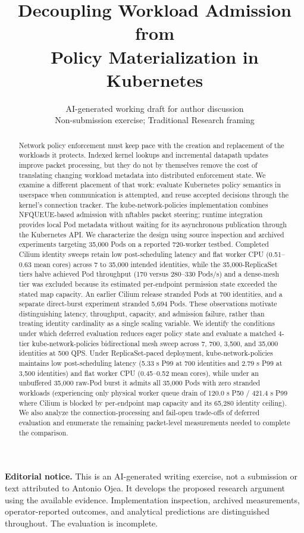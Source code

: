 \documentclass[letterpaper,twocolumn,10pt]{article}
\title{\Large\bf Decoupling Workload Admission from\\
Policy Materialization in Kubernetes}
\author{AI-generated working draft for author discussion\\
Non-submission exercise; Traditional Research framing}
\date{}
\begin{document}
\maketitle
\noindent\textbf{Editorial notice.} This is an AI-generated writing exercise,
not a submission or text attributed to Antonio Ojea. It develops the proposed
research argument using the available evidence. Implementation inspection,
archived measurements, operator-reported outcomes, and analytical predictions
are distinguished throughout. The evaluation is incomplete.

\begin{abstract}
Network policy enforcement must keep pace with the creation and replacement
of the workloads it protects. Indexed kernel lookups and incremental datapath
updates improve packet processing, but they do not by themselves remove the
cost of translating changing workload metadata into distributed enforcement
state. We examine a different placement of that work: evaluate Kubernetes
policy semantics in userspace when communication is attempted, and reuse
accepted decisions through the kernel's connection tracker. The
kube-network-policies implementation combines NFQUEUE-based admission with
nftables packet steering; runtime integration provides local Pod metadata
without waiting for its asynchronous publication through the Kubernetes API.
We characterize the design using source inspection and archived experiments
targeting 35,000 Pods on a reported 720-worker testbed. Completed Cilium
identity sweeps retain low post-scheduling latency and flat worker CPU
(0.51--0.63 mean cores) across 7 to 35,000 intended identities, while the
35,000-ReplicaSet tiers halve achieved Pod throughput (170 versus
280--330 Pods/s) and a dense-mesh tier was excluded because its estimated
per-endpoint permission state exceeded the stated map capacity. An earlier
Cilium release stranded Pods at 700 identities, and a separate direct-burst
experiment stranded 5,694 Pods. These observations motivate distinguishing
latency, throughput, capacity, and admission failure, rather than treating
identity cardinality as a single scaling variable. We identify the conditions
under which deferred evaluation reduces eager policy state and evaluate a
matched 4-tier kube-network-policies bidirectional mesh sweep across 7, 700,
3,500, and 35,000 identities at 500 QPS. Under ReplicaSet-paced deployment,
kube-network-policies maintains low post-scheduling latency (5.33 s P99 at
700 identities and 2.79 s P99 at 3,500 identities) and flat worker CPU
(0.45--0.52 mean cores), while under an unbuffered 35,000 raw-Pod burst it
admits all 35,000 Pods with zero stranded workloads (experiencing only
physical worker queue drain of 120.0 s P50 / 421.4 s P99 where Cilium is
blocked by per-endpoint map capacity and its 65,280 identity ceiling).
We also analyze the connection-processing and fail-open trade-offs of
deferred evaluation and enumerate the remaining packet-level measurements
needed to complete the comparison.
\end{abstract}
\end{document}
